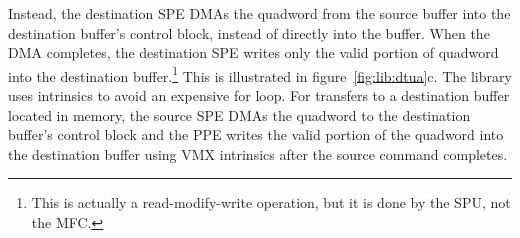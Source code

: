 Instead, the destination SPE DMAs the quadword from the source buffer into the destination buffer's control block, instead of directly into the buffer. When the DMA completes, the destination SPE writes only the valid portion of quadword into the destination buffer.\footnote{This is actually a read-modify-write operation, but it is done by the SPU, not the MFC.} This is illustrated in figure~\ref{fig:lib:dtua}c. The library uses intrinsics to avoid an expensive \textsf{for} loop. For transfers to a destination buffer located in memory, the source SPE DMAs the quadword to the destination buffer's control block and the PPE writes the valid portion of the quadword into the destination buffer using VMX intrinsics after the source command completes.
